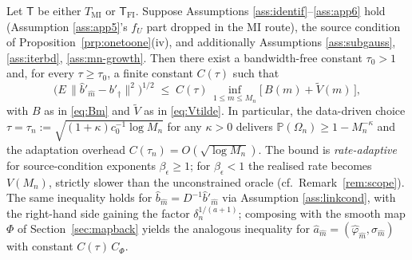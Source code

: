 
\begin{proposition}\label{prp:lepskii}
Let $\mathsf T$ be either $T_{\mathrm{MI}}$ or $\mathsf T_{\mathrm{FI}}$.
Suppose Assumptions \ref{ass:identif}--\ref{ass:app6} hold (Assumption
\ref{ass:app5}'s $f_U$ part dropped in the MI route), the source condition
of Proposition~\ref{prp:onetoone}\textup{(iv)}, and additionally
\textup{Assumptions \ref{ass:subgauss}, \ref{ass:iterbd}, \ref{ass:mn-growth}}.
Then there exist a bandwidth-free constant $\tau_0 > 1$
and, for every $\tau \ge \tau_0$, a finite constant $C(\tau)$ such that
\begin{equation}\label{eq:lepskiioracle}
\bigl(E\,\|\hat b'_{\hat m} - b'_\dagger\|^2\bigr)^{1/2}
\;\le\; C(\tau)\,\inf_{1 \le m \le M_n}\bigl[\,B(m) + \tilde V(m)\,\bigr],
\end{equation}
with $B$ as in \eqref{eq:Bm} and $\tilde V$ as in \eqref{eq:Vtilde}. In
particular, the data-driven choice $\tau = \tau_n :=
\sqrt{(1+\kappa)c_0^{-1}\log M_n}$ for any $\kappa > 0$ delivers
$\mathbb P(\Omega_n) \ge 1 - M_n^{-\kappa}$ and the adaptation
overhead $C(\tau_n) = O(\sqrt{\log M_n})$.
The bound is \emph{rate-adaptive} for source-condition exponents
$\beta_\epsilon \ge 1$; for $\beta_\epsilon < 1$ the realised rate
becomes $V(M_n)$, strictly slower than the unconstrained oracle
(cf.\ Remark~\ref{rem:scope}). %
The same
inequality holds for $\hat b_{\hat m} = D^{-1}\hat b'_{\hat m}$ via
Assumption \ref{ass:linkcond}, with the right-hand side gaining the factor
$\delta_n^{1/(a+1)}$; composing with the smooth map $\Phi$ of
Section~\ref{sec:mapback} yields the analogous inequality for
$\hat a_{\hat m} = (\hat\varphi_{\hat m}, \hat\sigma_{\hat m})$
with constant $C(\tau)\,C_\Phi$.
\end{proposition}

